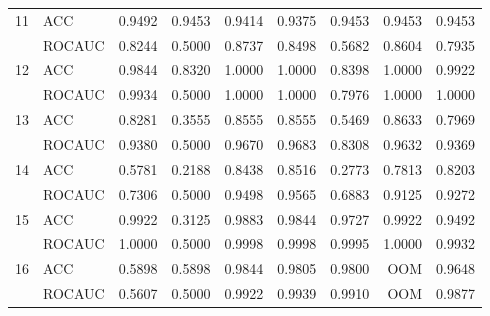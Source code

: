 \begin{table}[]
{\begin{tabular}{@{}llrrrrrrr@{}}
\multicolumn{1}{r}{11} & ACC     & 0.9492                 & 0.9453                  & 0.9414                       & 0.9375                      & 0.9453      & 0.9453       & 0.9453                     \\
                       & ROCAUC  & 0.8244                 & 0.5000                  & 0.8737                       & 0.8498                      & 0.5682      & 0.8604       & 0.7935                     \\
\multicolumn{1}{r}{12} & ACC     & 0.9844                 & 0.8320                  & 1.0000                       & 1.0000                      & 0.8398      & 1.0000       & 0.9922                     \\
                       & ROCAUC  & 0.9934                 & 0.5000                  & 1.0000                       & 1.0000                      & 0.7976      & 1.0000       & 1.0000                     \\
\multicolumn{1}{r}{13} & ACC     & 0.8281                 & 0.3555                  & 0.8555                       & 0.8555                      & 0.5469      & 0.8633       & 0.7969                     \\
                       & ROCAUC  & 0.9380                 & 0.5000                  & 0.9670                       & 0.9683                      & 0.8308      & 0.9632       & 0.9369                     \\
\multicolumn{1}{r}{14} & ACC     & 0.5781                 & 0.2188                  & 0.8438                       & 0.8516                      & 0.2773      & 0.7813       & 0.8203                     \\
                       & ROCAUC  & 0.7306                 & 0.5000                  & 0.9498                       & 0.9565                      & 0.6883      & 0.9125       & 0.9272                     \\
\multicolumn{1}{r}{15} & ACC     & 0.9922                 & 0.3125                  & 0.9883                       & 0.9844                      & 0.9727      & 0.9922       & 0.9492                     \\
                       & ROCAUC  & 1.0000                 & 0.5000                  & 0.9998                       & 0.9998                      & 0.9995      & 1.0000       & 0.9932                     \\
\multicolumn{1}{r}{16} & ACC     & 0.5898                 & 0.5898                  & 0.9844                       & 0.9805                      & 0.9800      & OOM          & 0.9648                     \\
                       & ROCAUC  & 0.5607                 & 0.5000                  & 0.9922                       & 0.9939                      & 0.9910      & OOM          & 0.9877                     \\ \bottomrule
\end{tabular}
}
\end{table}